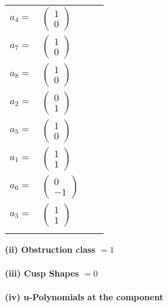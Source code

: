 \documentclass[1p]{elsarticle_modified}
\theoremstyle{definition}
\begin{document}
\begin{tabular}{m{7pt} m{180pt} m{7pt} m{180pt} }
\flushright $a_{4}=$&$\begin{pmatrix}1\\0\end{pmatrix}$ \\
\flushright $a_{7}=$&$\begin{pmatrix}1\\0\end{pmatrix}$ \\
\flushright $a_{8}=$&$\begin{pmatrix}1\\0\end{pmatrix}$ \\
\flushright $a_{2}=$&$\begin{pmatrix}0\\1\end{pmatrix}$ \\
\flushright $a_{5}=$&$\begin{pmatrix}1\\0\end{pmatrix}$ \\
\flushright $a_{1}=$&$\begin{pmatrix}1\\1\end{pmatrix}$ \\
\flushright $a_{6}=$&$\begin{pmatrix}0\\-1\end{pmatrix}$ \\
\flushright $a_{3}=$&$\begin{pmatrix}1\\1\end{pmatrix}$\\&\end{tabular}
\flushleft \textbf{(ii) Obstruction class $= 1$}\\~\\
\flushleft \textbf{(iii) Cusp Shapes $= 0$}\\~\\
\newpage\renewcommand{\arraystretch}{1}
\flushleft \textbf{(iv) u-Polynomials at the component}\newline \\
\end{document}

